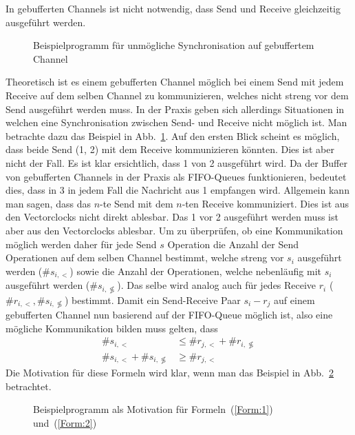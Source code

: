 In gebufferten Channels ist nicht notwendig, dass Send und Receive gleichzeitig
ausgeführt werden.
\begin{figure}[h!]
  \centering
  
  \caption{Beispielprogramm für unmögliche Synchronisation auf gebuffertem Channel}
  \label{Chap:Analyze-Sec:Channel-SubSec:Dangling-Fig:BufferedNoSync}
\end{figure}
Theoretisch ist es einem gebufferten Channel möglich bei einem Send mit 
jedem Receive auf dem selben Channel zu kommunizieren, welches nicht 
streng vor dem Send ausgeführt werden muss. In der Praxis geben sich allerdings 
Situationen in welchen eine Synchronisation zwischen Send- und Receive nicht 
möglich ist. Man betrachte dazu das Beispiel in 
Abb.~\ref{Chap:Analyze-Sec:Channel-SubSec:Dangling-Fig:BufferedNoSync}.
Auf den ersten Blick scheint es möglich, dass beide Send (1, 2) mit dem 
Receive kommunizieren könnten. Dies ist aber nicht der Fall.
Es ist klar ersichtlich, dass 1 von 2 ausgeführt wird. Da der Buffer von 
gebufferten Channels in der Praxis als FIFO-Queues funktionieren, 
bedeutet dies, dass in 3 in jedem Fall die Nachricht aus 1 empfangen wird.
Allgemein kann man sagen, dass das $n$-te Send mit dem $n$-ten Receive 
kommuniziert. 
Dies ist aus den Vectorclocks nicht direkt ablesbar. Das 1 vor 2 ausgeführt 
werden muss ist aber aus den Vectorclocks ablesbar. Um zu überprüfen, 
ob eine Kommunikation möglich werden daher für jede Send $s$ Operation 
die Anzahl der Send Operationen auf dem selben Channel bestimmt, welche streng vor $s_i$ 
ausgeführt werden ($\#s_{i, <}$) sowie die Anzahl der Operationen, welche nebenläufig mit $s_i$ 
ausgeführt werden ($\#s_{i, \not\lessgtr}$). Das selbe wird analog auch 
für jedes Receive $r_i$ ($\#r_{i, <}, \#s_{i, \not\lessgtr}$) bestimmt. 
Damit ein Send-Receive Paar $s_i - r_j$ auf 
einem gebufferten Channel nun basierend auf der FIFO-Queue möglich ist, 
also eine mögliche Kommunikation bilden muss gelten, dass 
\begin{align}
  \#s_{i, <} &\leq \#r_{j, <} + \#r_{i, \not\lessgtr}\label{Form:1}\\
  \#s_{i, <} + \#s_{i, \not\lessgtr} &\geq \#r_{j, <}\label{Form:2}
\end{align}
Die Motivation für diese Formeln wird klar, wenn man das Beispiel in 
Abb.~\ref{Chap:Analyze-Sec:Channel-SubSec:Dangling-Fig:BufferForm} betrachtet.
\begin{figure}[h!]
  \centering
  
  \caption{Beispielprogramm als Motivation für Formeln~(\ref{Form:1}) und~(\ref{Form:2})}
  \label{Chap:Analyze-Sec:Channel-SubSec:Dangling-Fig:BufferForm}
\end{figure}
